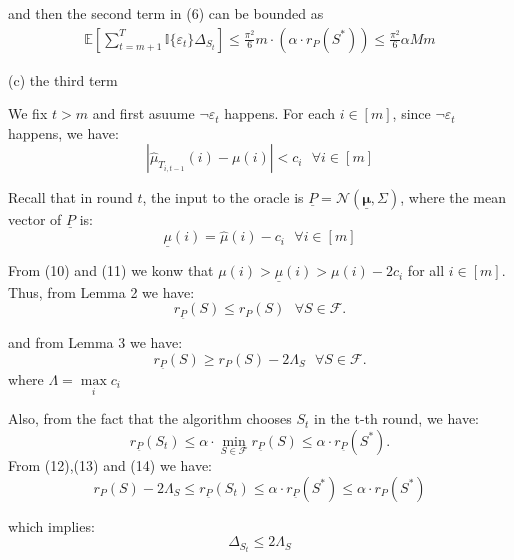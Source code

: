 \documentclass[opre,sglanonrev]{informs4}
\begin{document}
and then the second term in (6) can be bounded as
\begin{equation}
	\begin{aligned}
		\mathbb{E}[\sum_{t=m+1}^{T}\mathbb{I}\{\varepsilon_t\}\Delta_{S_t}]\leq \frac{\pi^2}{6}m \cdot (\alpha \cdot r_P(S^*)) \leq \frac{\pi^2}{6}\alpha M m
	\end{aligned}
\end{equation}

(c) the third term 

We fix $t>m$ and first asuume $\lnot \varepsilon_t$ happens. For each $i \in [m]$, since $\lnot \varepsilon_t$ happens, we have:
\begin{equation}
	|\hat{\mu}_{T_{i,t-1}}(i)-\mu(i)| < c_i ~~~ \forall i \in [m]
\end{equation}

Recall that in round $t$, the input to the oracle is $\underline{P} = \mathcal{N}(\underline{\boldsymbol{\mu}},\Sigma)$, where the mean vector of $\underline{P}$ is:
\begin{equation}
	\underline{\mu}(i) = \hat{\mu}(i)-c_i ~~~ \forall i \in [m]
\end{equation}

From (10) and (11) we  konw that $\mu(i)>\underline{\mu}(i)>\mu(i)-2c_i$ for all $i \in [m]$. Thus, from Lemma 2 we have:
\begin{equation}
	r_{\underline{P}}(S)\leq r_P(S) ~~~ \forall S \in \mathcal{F}.
\end{equation}

and from Lemma 3 we have:
\begin{equation}
	r_{\underline{P}}(S)\geq r_P(S)-2\Lambda_S ~~~ \forall S \in \mathcal{F}.
\end{equation}
where $\Lambda = \mathop{\max}\limits_{i}c_i$

Also, from the fact that the algorithm chooses $S_t$ in the t-th round, we have:
\begin{equation}
	r_{\underline{P}}(S_t)\leq \alpha \cdot \mathop{\min}\limits_{S \in \mathcal{F}}r_{\underline{P}}(S) \leq \alpha \cdot r_{\underline{P}}(S^*).
\end{equation}
From (12),(13) and (14) we have:
\begin{equation}
	r_P(S)-2\Lambda_S \leq r_{\underline{P}}(S_t) \leq \alpha \cdot r_{\underline{P}}(S^*) \leq \alpha \cdot r_P(S^*)
\end{equation}

which implies:
$$
	\Delta_{S_t} \leq 2\Lambda_S
$$
\end{document}
